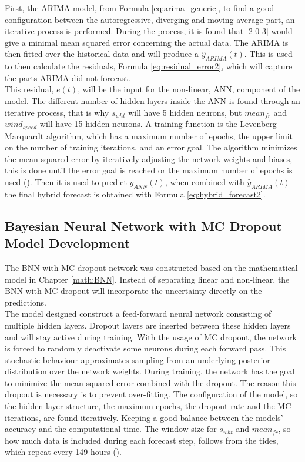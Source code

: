 \noindent First, the ARIMA model, from Formula \ref{eq:arima_generic}, to find a good configuration between the autoregressive, diverging and moving average part, an iterative process is performed. During the process, it is found that [2 0 3] would give a minimal mean squared error concerning the actual data. The ARIMA is then fitted over the historical data and will produce a \(\hat{y}_{ARIMA}(t)\). This is used to then calculate the residuals, Formula \ref{eq:residual_error2}, which will capture the parts ARIMA did not forecast.\\

\noindent This residual, \(e(t)\), will be the input for the non-linear, ANN, component of the model. The different number of hidden layers inside the ANN is found through an iterative process, that is why \(s_{wht}\) will have 5 hidden neurons, but \(mean_{fr}\) and \(wind_{speed}\) will have 15 hidden neurons. A training function is the Levenberg-Marquardt algorithm, which has a maximum number of epochs, the upper limit on the number of training iterations, and an error goal. The algorithm minimizes the mean squared error by iteratively adjusting the network weights and biases, this is done until the error goal is reached or the maximum number of epochs is used (\cite{hagan1994training}). Then it is used to predict \(y_{ANN}(t)\), when combined with  \(\hat{y}_{ARIMA}(t)\) the final hybrid forecast is obtained with Formula \ref{eq:hybrid_forecast2}.

\subsection{Bayesian Neural Network with MC Dropout Model Development}
The BNN with MC dropout network was constructed based on the mathematical model in Chapter \ref{math:BNN}. Instead of separating linear and non-linear, the BNN with MC dropout will incorporate the uncertainty directly on the predictions.\\

\noindent The model designed construct a feed-forward neural network consisting of multiple hidden layers. Dropout layers are inserted between these hidden layers and will stay active during training. With the usage of MC dropout, the network is forced to randomly deactivate some neurons during each forward pass. This stochastic behaviour approximates sampling from an underlying posterior distribution over the network weights. 
During training, the network has the goal to minimize the mean squared error combined with the dropout. The reason this dropout is necessary is to prevent over-fitting. The configuration of the model, so the hidden layer structure, the maximum epochs, the dropout rate and the MC iterations, are found iteratively. Keeping a good balance between the models' accuracy and the computational time. The window size for \(s_{wht}\) and \(mean_{fr}\), so how much data is included during each forecast step, follows from the tides, which repeat every 149 hours (\cite{pugh1987tides}).\\

